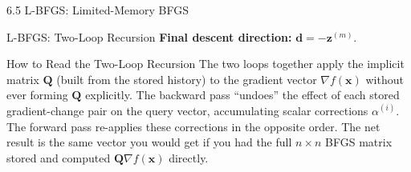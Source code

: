 \documentclass[aspectratio=169,10pt]{beamer}
\newcommand{\xbf}{\mathbf{x}}
\begin{document}
\begin{frame}[allowframebreaks]{6.5 L-BFGS: Limited-Memory BFGS}
\begin{block}{L-BFGS: Two-Loop Recursion}
    \textbf{Final descent direction:} $\mathbf{d} = -\mathbf{z}^{(m)}$.
  \end{block}

  \begin{alertblock}{How to Read the Two-Loop Recursion}
    The two loops together apply the implicit matrix $\mathbf{Q}$ (built from the
    stored history) to the gradient vector $\nabla f(\xbf)$ without ever forming
    $\mathbf{Q}$ explicitly.  The backward pass ``undoes'' the effect of each
    stored gradient-change pair on the query vector, accumulating scalar
    corrections $\alpha^{(i)}$.  The forward pass re-applies these corrections in
    the opposite order.  The net result is the same vector you would get if you
    had the full $n\times n$ BFGS matrix stored and computed $\mathbf{Q}\nabla f(\xbf)$ directly.
  \end{alertblock}

  \framebreak


\end{frame}
\end{document}
